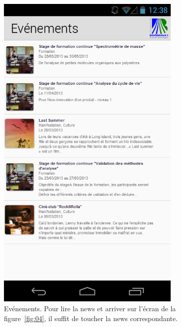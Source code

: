 \documentclass [pdftex,12pt] {report}
\begin{document}
\begin{figure}
  \begin{minipage}[t]{8cm}
    \centering
    \includegraphics[width=0.8\textwidth]{resources/ui_preview/03}
    \caption{Evénements. Pour lire la news et arriver sur l'écran de la figure~\ref{fig:04}, il suffit de toucher la news correspondante.}
    \label{fig:03}
  \end{minipage}
  \hspace{+20pt}
  \begin{minipage}[t]{8cm}
    \centering

\end{minipage}
\end{figure}
\end{document}
